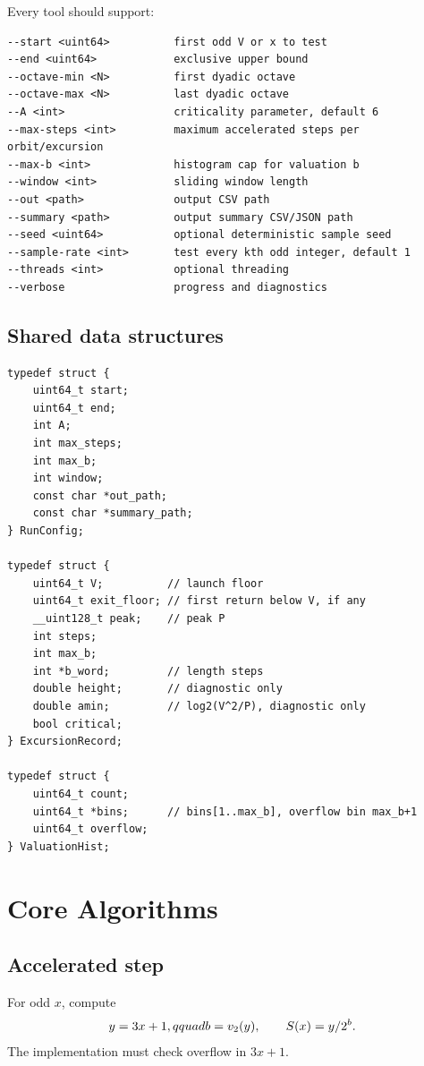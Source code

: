 \documentclass[11pt]{article}
\newcommand{\ord}{v_2}
\begin{document}
Every tool should support:
\begin{verbatim}
--start <uint64>          first odd V or x to test
--end <uint64>            exclusive upper bound
--octave-min <N>          first dyadic octave
--octave-max <N>          last dyadic octave
--A <int>                 criticality parameter, default 6
--max-steps <int>         maximum accelerated steps per orbit/excursion
--max-b <int>             histogram cap for valuation b
--window <int>            sliding window length
--out <path>              output CSV path
--summary <path>          output summary CSV/JSON path
--seed <uint64>           optional deterministic sample seed
--sample-rate <int>       test every kth odd integer, default 1
--threads <int>           optional threading
--verbose                 progress and diagnostics
\end{verbatim}

\subsection{Shared data structures}

\begin{lstlisting}
typedef struct {
    uint64_t start;
    uint64_t end;
    int A;
    int max_steps;
    int max_b;
    int window;
    const char *out_path;
    const char *summary_path;
} RunConfig;

typedef struct {
    uint64_t V;          // launch floor
    uint64_t exit_floor; // first return below V, if any
    __uint128_t peak;    // peak P
    int steps;
    int max_b;
    int *b_word;         // length steps
    double height;       // diagnostic only
    double amin;         // log2(V^2/P), diagnostic only
    bool critical;
} ExcursionRecord;

typedef struct {
    uint64_t count;
    uint64_t *bins;      // bins[1..max_b], overflow bin max_b+1
    uint64_t overflow;
} ValuationHist;
\end{lstlisting}

\section{Core Algorithms}

\subsection{Accelerated step}

For odd $x$, compute
\[
  y=3x+1,\\qquad b=\ord(y),\qquad S(x)=y/2^b.
\]
The implementation must check overflow in $3x+1$.
\end{document}
